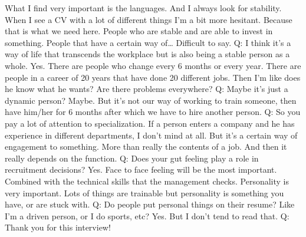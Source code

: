 \documentclass[a4paper,fleqn,11pt,dvips,titlepage]{article}
\numberwithin{figure}{section}
\numberwithin{equation}{section}
\begin{document}
What I find very important is the languages. And I always look for stability. When I see a CV with a lot of different things I’m a bit more hesitant. Because that is what we need here. People who are stable and are able to invest in something. People that have a certain way of… Difficult to say. 
Q: I think it’s a way of life that transcends the workplace but is also being a stable person as a whole. 
Yes. There are people who change every 6 months or every year. There are people in a career of 20 years that have done 20 different jobs. Then I’m like does he know what he wants? Are there problems everywhere? 
Q: Maybe it’s just a dynamic person? 
Maybe. But it’s not our way of working to train someone, then have him/her for 6 months after which we have to hire another person. 
Q: So you pay a lot of attention to specialization. 
If a person enters a company and he has experience in different departments, I don’t mind at all. But it’s a certain way of engagement to something. More than really the contents of a job. And then it really depends on the function. 
Q: Does your gut feeling play a role in recruitment decisions? 
Yes. Face to face feeling will be the most important. Combined with the technical skills that the management checks. Personality is very important. Lots of things are trainable but personality is something you have, or are stuck with. 
Q: Do people put personal things on their resume? Like I’m a driven person, or I do sports, etc? 
Yes. But I don’t tend to read that. 
Q: Thank you for this interview!
\end{document}
